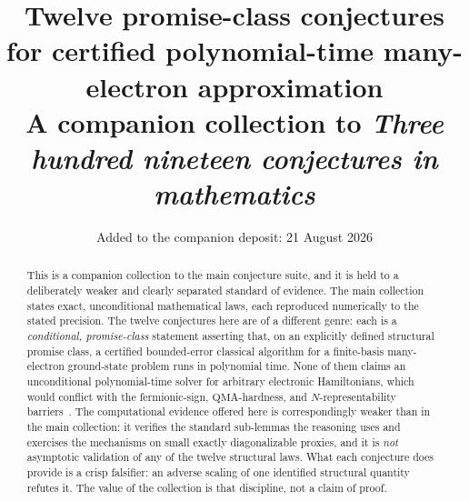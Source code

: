 \documentclass[11pt]{article}
\title{Twelve promise-class conjectures for certified polynomial-time
many-electron approximation\\[4pt]
\large A companion collection to \emph{Three hundred nineteen conjectures in mathematics}}
\author{}
\date{Added to the companion deposit: 21 August 2026}
\theoremstyle{definition}
\begin{document}
\maketitle

\begin{abstract}
This is a companion collection to the main conjecture suite, and it is held to a
deliberately weaker and clearly separated standard of evidence.  The main
collection states exact, unconditional mathematical laws, each reproduced
numerically to the stated precision.  The twelve conjectures here are of a
different genre: each is a \emph{conditional, promise-class} statement asserting
that, on an explicitly defined structural promise class, a certified
bounded-error classical algorithm for a finite-basis many-electron ground-state
problem runs in polynomial time.  None of them claims an unconditional
polynomial-time solver for arbitrary electronic Hamiltonians, which would
conflict with the fermionic-sign, $\mathrm{QMA}$-hardness, and
$N$-representability barriers~\cite{R1,R2,R3}.  The computational evidence
offered here is correspondingly weaker than in the main collection: it verifies
the standard sub-lemmas the reasoning uses and exercises the mechanisms on small
exactly diagonalizable proxies, and it is \emph{not} asymptotic validation of any
of the twelve structural laws.  What each conjecture does provide is a crisp
falsifier: an adverse scaling of one identified structural quantity refutes it.
The value of the collection is that discipline, not a claim of proof.
\end{abstract}
\end{document}
